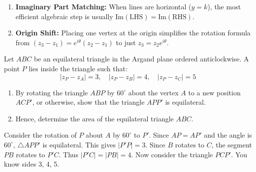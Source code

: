 \begin{takeaways}
\begin{enumerate}
    \item \textbf{Imaginary Part Matching:} When lines are horizontal ($y=k$), the most efficient algebraic step is usually $\text{Im}(\text{LHS}) = \text{Im}(\text{RHS})$.
    \item \textbf{Origin Shift:} Placing one vertex at the origin simplifies the rotation formula from $(z_3-z_1) = e^{i\theta}(z_2-z_1)$ to just $z_3 = z_2 e^{i\theta}$.
\end{enumerate}
\end{takeaways}

\begin{problem}
Let $ABC$ be an equilateral triangle in the Argand plane ordered anticlockwise.
A point $P$ lies inside the triangle such that:
\[ |z_P - z_A| = 3, \quad |z_P - z_B| = 4, \quad |z_P - z_C| = 5 \]
\begin{enumerate}
    \item[(i)] By rotating the triangle $ABP$ by $60^\circ$ about the vertex $A$ to a new position $ACP'$, or otherwise, show that the triangle $APP'$ is equilateral.
    \item[(ii)] Hence, determine the area of the equilateral triangle $ABC$.
\end{enumerate}
\end{problem}

\begin{hint}
Consider the rotation of $P$ about $A$ by $60^\circ$ to $P'$.
Since $AP = AP'$ and the angle is $60^\circ$, $\triangle APP'$ is equilateral.
This gives $|P'P| = 3$.
Since $B$ rotates to $C$, the segment $PB$ rotates to $P'C$. Thus $|P'C| = |PB| = 4$.
Now consider the triangle $PCP'$. You know sides 3, 4, 5.
\end{hint}

